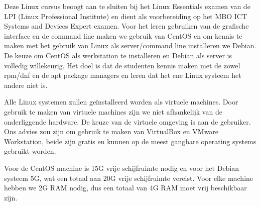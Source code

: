 Deze Linux cursus beoogt aan te sluiten bij het Linux Essentials examen van de LPI (Linux Professional Institute) en dient als voorbereiding op het MBO ICT Systems and Devices Expert examen. Voor het leren gebruiken van de grafische interface en de command line maken we gebruik van CentOS en om kennis te maken met het gebruik van Linux als server/command line installeren we Debian. De keuze om CentOS als werkstation te installeren en Debian als server is volledig willekeurig. Het doel is dat de studenten kennis maken met de zowel rpm/dnf en de apt package managers en leren dat het ene Linux systeem het andere niet is.

Alle Linux systemen zullen ge\"installeerd worden als virtuele machines. Door gebruik te maken van virtuele machines zijn we niet afhankelijk van de onderliggende hardware. De keuze van de virtuele omgeving is aan de gebruiker. Ons advies zou zijn om gebruik te maken van VirtualBox en VMware Workstation, beide zijn gratis en kunnen op de meest gangbare operating systems gebruikt worden.

Voor de CentOS machine is 15G vrije schijfruimte nodig en voor het Debian systeem 5G, wat een totaal aan 20G vrije schijfruimte vereist. Voor elke machine hebben we 2G RAM nodig, dus een totaal van 4G RAM moet vrij beschikbaar zijn.


